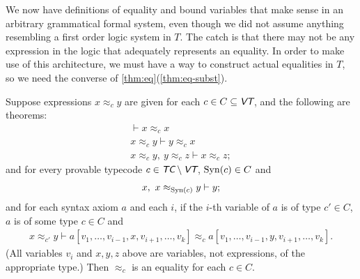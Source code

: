 \documentclass[runningheads,a4paper]{llncs}
\newcommand{\tc}{\textit{\textsf{TC}}} %
\newcommand{\vt}{\textit{\textsf{VT}}} %
\newcommand{\syn}{{\rm Syn}}
\begin{document}
We now have definitions of equality and bound variables that make sense in an arbitrary grammatical formal system, even though we did not assume anything resembling a first order logic system in $T$.  The catch is that there may not be any expression in the logic that adequately represents an equality.  In order to make use of this architecture, we must have a way to construct actual equalities in $T$, so we need the converse of \autoref{thm:eq}(\ref{thm:eq-subst}).

\begin{theorem}\label{thm:eq}
Suppose expressions $x\approx_c y$ are given for each $c\in C\subseteq\vt$, and the following are theorems:
\begin{gather}
\vdash x\approx_c x\label{eqn:refl}\\
x\approx_c y\vdash y\approx_c x\label{eqn:sym}\\
x\approx_c y,\ y\approx_c z\vdash x\approx_c z;\label{eqn:trans}
\end{gather}
and for every provable typecode $c\in\tc\setminus\vt$, $\syn(c)\in C$ and
\begin{gather}
x,\ x\approx_{\syn(c)} y\vdash y;\label{eqn:mp}
\end{gather}
and for each syntax axiom $a$ and each $i$, if the $i$-th variable of $a$ is of type $c'\in C$, $a$ is of some type $c\in C$ and
\begin{gather}
x\approx_{c'} y\vdash a[v_1,\dots,v_{i-1},x,v_{i+1},\dots,v_k]\approx_c a[v_1,\dots,v_{i-1},y,v_{i+1},\dots,v_k].\label{eqn:subst}
\end{gather}
(All variables $v_i$ and $x,y,z$ above are variables, not expressions, of the appropriate type.) Then $\approx_c$ is an equality for each $c\in C$.
\end{theorem}
\end{document}
